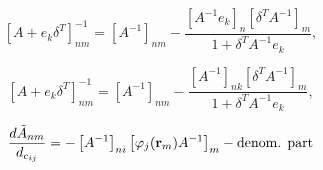 \documentclass{article}
\begin{document}
\begin{equation}
\left[A + e_k\delta^T\right]^{-1}_{nm} = \left[A^{-1}\right]_{nm} - \frac{\left[A^{-1}e_k\right]_n\left[\delta^T
  A^{-1}\right]_m}{1 + \delta^T A^{-1}e_k},
\end{equation}

\begin{equation}
\left[A + e_k\delta^T\right]^{-1}_{nm} = \left[A^{-1}\right]_{nm} - \frac{\left[A^{-1}\right]_{nk}\left[\delta^T
  A^{-1}\right]_m}{1 + \delta^T A^{-1}e_k},
\end{equation}

\begin{equation}
\frac{d \tilde{A}_{nm}}{d_{c_{ij}}} =
-\left[A^{-1}\right]_{ni}\left[\varphi_j(\mathbf{r}_m)A^{-1}\right]_m -
\text{denom. part}
\end{equation}
\end{document}
